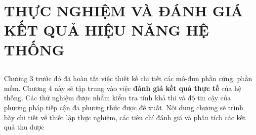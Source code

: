 \chapter[KẾT QUẢ VÀ THỰC NGHIỆM]{THỰC NGHIỆM VÀ ĐÁNH GIÁ KẾT QUẢ HIỆU NĂNG HỆ THỐNG}
\label{chap:results} %

\section*{} %
Chương 3 trước đó đã hoàn tất việc thiết kế chi tiết các mô-đun phần cứng, phần mềm. Chương 4 này sẽ tập trung vào việc \textbf{đánh giá kết quả thực tế} của hệ thống. Các thử nghiệm được nhằm kiểm tra tính khả thi và độ tin cậy của phương pháp tiếp cận đa phương thức được đề xuất. Nội dung chương sẽ trình bày chi tiết về thiết lập thực nghiệm, các tiêu chí đánh giá và phân tích các kết quả thu được

